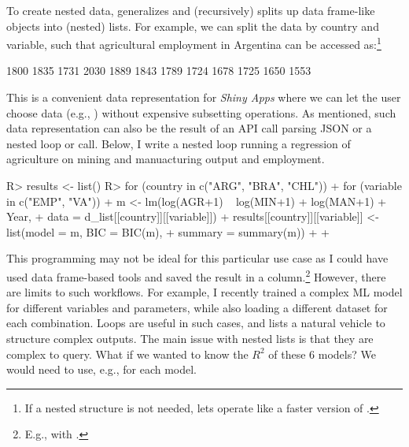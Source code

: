 \documentclass[article]{jss} %
\newcommand{\fct}[1]{\code{#1()}}
\begin{document}
To create nested data, \fct{rsplit} generalizes \fct{split} and (recursively) splits up data frame-like objects into (nested) lists. For example, we can split the  data by country and variable, such that agricultural employment in Argentina can be accessed as:\footnote{If a nested structure is not needed,  lets \fct{rsplit} operate like a faster version of \fct{split}.} \newpage
%
\begin{Schunk}
\begin{Soutput}
 [1] 1800 1835 1731 2030 1889 1843 1789 1724 1678 1725 1650 1553
\end{Soutput}
\end{Schunk}
%
This is a convenient data representation for \emph{Shiny Apps} where we can let the user choose data (e.g., ) without expensive subsetting operations. As mentioned, such data representation can also be the result of an API call parsing JSON or a nested loop or \fct{lapply} call. Below, I write a nested loop running a regression of agriculture on mining and manuacturing output and employment.
\begin{Schunk}
\begin{Sinput}
R> results <- list()
R> for (country in c("ARG", "BRA", "CHL")) {
+    for (variable in c("EMP", "VA")) {
+      m <- lm(log(AGR+1) ~ log(MIN+1) + log(MAN+1) + Year,
+              data = d_list[[country]][[variable]])
+      results[[country]][[variable]] <- list(model = m, BIC = BIC(m),
+                                             summary = summary(m))
+    }
+  }
\end{Sinput}
\end{Schunk}
This programming may not be ideal for this particular use case as I could have used data frame-based tools and saved the result in a column.\footnote{E.g.,  with .}
However, there are limits to such workflows. For example, I recently trained a complex ML model for different variables and parameters, while also loading a different dataset for each combination. Loops are useful in such cases, and lists a natural vehicle to structure complex outputs. The main issue with nested lists is that they are complex to query. What if we wanted to know the $R^2$ of these 6 models? We would need to use, e.g.,  for each model.\newline
\end{document}
